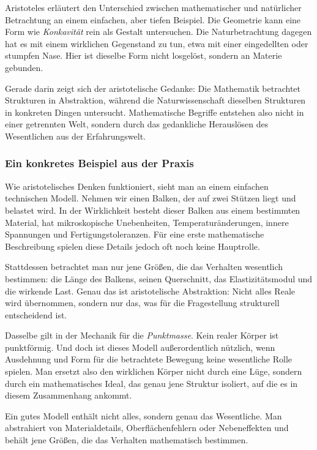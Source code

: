 Aristoteles erläutert den Unterschied zwischen mathematischer und natürlicher Betrachtung
an einem einfachen,
aber tiefen Beispiel.
Die Geometrie kann eine Form wie \emph{Konkavität} rein als Gestalt untersuchen.
Die Naturbetrachtung dagegen hat es mit einem wirklichen Gegenstand zu tun,
etwa mit einer eingedellten oder stumpfen Nase.
Hier ist dieselbe Form nicht losgelöst,
sondern an Materie gebunden.

Gerade darin zeigt sich der aristotelische Gedanke:
Die Mathematik betrachtet Strukturen in Abstraktion,
während die Naturwissenschaft dieselben Strukturen in konkreten Dingen untersucht.
Mathematische Begriffe entstehen also nicht in einer getrennten Welt,
sondern durch das gedankliche Herauslösen des Wesentlichen aus der Erfahrungswelt.

\subsubsection*{Ein konkretes Beispiel aus der Praxis}

Wie aristotelisches Denken funktioniert,
sieht man an einem einfachen technischen Modell.
Nehmen wir einen Balken,
der auf zwei Stützen liegt und belastet wird.
In der Wirklichkeit besteht dieser Balken aus einem bestimmten Material,
hat mikroskopische Unebenheiten,
Temperaturänderungen,
innere Spannungen und Fertigungstoleranzen.
Für eine erste mathematische Beschreibung spielen diese Details jedoch oft noch keine Hauptrolle.

Stattdessen betrachtet man nur jene Größen,
die das Verhalten wesentlich bestimmen:
die Länge des Balkens,
seinen Querschnitt,
das Elastizitätsmodul
und die wirkende Last.
Genau das ist aristotelische Abstraktion:
Nicht alles Reale wird übernommen,
sondern nur das,
was für die Fragestellung strukturell entscheidend ist.

Dasselbe gilt in der Mechanik für die \emph{Punktmasse}.
Kein realer Körper ist punktförmig.
Und doch ist dieses Modell außerordentlich nützlich,
wenn Ausdehnung und Form für die betrachtete Bewegung keine wesentliche Rolle spielen.
Man ersetzt also den wirklichen Körper nicht durch eine Lüge,
sondern durch ein mathematisches Ideal,
das genau jene Struktur isoliert,
auf die es in diesem Zusammenhang ankommt.

\begin{DidacticBox}
	\label{box:aristoteles-ingenieur}
	\small
	Ein gutes Modell enthält nicht alles,
	sondern genau das Wesentliche.
	Man abstrahiert von Materialdetails,
	Oberflächenfehlern oder Nebeneffekten
	und behält jene Größen,
	die das Verhalten mathematisch bestimmen.
\end{DidacticBox}

